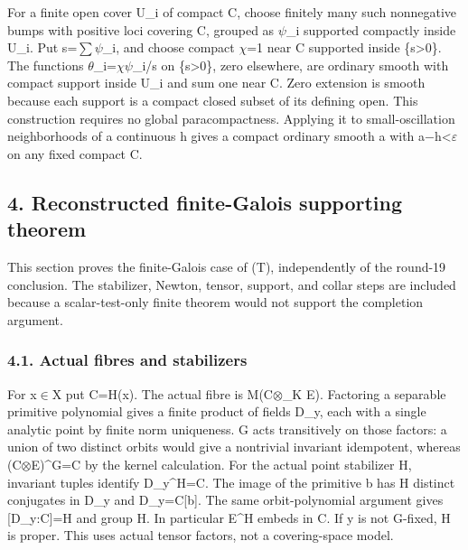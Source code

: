 \documentclass[
  10pt,
]{article}
\begin{document}
For a finite open cover U\_i of compact C, choose finitely many such
nonnegative bumps with positive loci covering C, grouped as \ensuremath{\psi}\_i
supported compactly inside U\_i. Put s=\ensuremath{\sum}\ensuremath{\psi}\_i, and choose compact \ensuremath{\chi}=1
near C supported inside \{s\textgreater0\}. The functions \ensuremath{\theta}\_i=\ensuremath{\chi}\ensuremath{\psi}\_i/s
on \{s\textgreater0\}, zero elsewhere, are ordinary smooth with compact
support inside U\_i and sum one near C. Zero extension is smooth because
each support is a compact closed subset of its defining open. This
construction requires no global paracompactness. Applying it to
small-oscillation neighborhoods of a continuous h gives a compact
ordinary smooth a with \textbar a\ensuremath{-}h\textbar\textless \ensuremath{\varepsilon} on any fixed
compact C.

\subsection{4. Reconstructed finite-Galois supporting
theorem}\label{reconstructed-finite-galois-supporting-theorem}

This section proves the finite-Galois case of (T), independently of the
round-19 conclusion. The stabilizer, Newton, tensor, support, and collar
steps are included because a scalar-test-only finite theorem would not
support the completion argument.

\subsubsection{4.1. Actual fibres and
stabilizers}\label{actual-fibres-and-stabilizers}

For x\ensuremath{\in}X put C=H(x). The actual fibre is M(C\ensuremath{\otimes}\_K E). Factoring a
separable primitive polynomial gives a finite product of fields D\_y,
each with a single analytic point by finite norm uniqueness. G acts
transitively on those factors: a union of two distinct orbits would give
a nontrivial invariant idempotent, whereas (C\ensuremath{\otimes}E)\^{}G=C by the kernel
calculation. For the actual point stabilizer H, invariant tuples
identify D\_y\^{}H=C. The image of the primitive b has
\textbar H\textbar{} distinct conjugates in D\_y and D\_y=C{[}b{]}. The
same orbit-polynomial argument gives {[}D\_y:C{]}=\textbar H\textbar{}
and group H. In particular E\^{}H embeds in C. If y is not G-fixed, H is
proper. This uses actual tensor factors, not a covering-space model.
\end{document}
